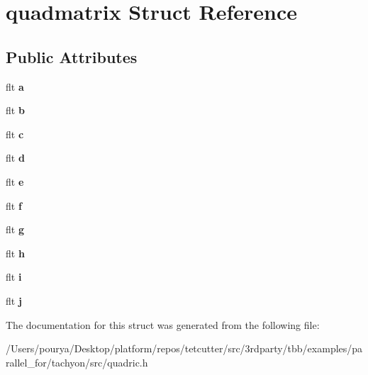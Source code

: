 \hypertarget{structquadmatrix}{}\section{quadmatrix Struct Reference}
\label{structquadmatrix}
\subsection*{Public Attributes}
\begin{DoxyCompactItemize}
\item 
\hypertarget{structquadmatrix_a3070ed936e562a8a2ebaf85258751c04}{}flt {\bfseries a}\label{structquadmatrix_a3070ed936e562a8a2ebaf85258751c04}

\item 
\hypertarget{structquadmatrix_ab70d6e0b85bae9407ec1fa6d733c500a}{}flt {\bfseries b}\label{structquadmatrix_ab70d6e0b85bae9407ec1fa6d733c500a}

\item 
\hypertarget{structquadmatrix_aa38ada8c0a5c1ef797bea1f8b524768f}{}flt {\bfseries c}\label{structquadmatrix_aa38ada8c0a5c1ef797bea1f8b524768f}

\item 
\hypertarget{structquadmatrix_ac3404ac1be96d5d5991fa146acfbe098}{}flt {\bfseries d}\label{structquadmatrix_ac3404ac1be96d5d5991fa146acfbe098}

\item 
\hypertarget{structquadmatrix_ab4513d40ae09bfacf51588614681dafc}{}flt {\bfseries e}\label{structquadmatrix_ab4513d40ae09bfacf51588614681dafc}

\item 
\hypertarget{structquadmatrix_a46f8d76c7ad5d4bc58edf72b8e210763}{}flt {\bfseries f}\label{structquadmatrix_a46f8d76c7ad5d4bc58edf72b8e210763}

\item 
\hypertarget{structquadmatrix_a13149d6521c37c01735c775e2129541e}{}flt {\bfseries g}\label{structquadmatrix_a13149d6521c37c01735c775e2129541e}

\item 
\hypertarget{structquadmatrix_aa781b47213b173a9cd9fa5e69bcd98da}{}flt {\bfseries h}\label{structquadmatrix_aa781b47213b173a9cd9fa5e69bcd98da}

\item 
\hypertarget{structquadmatrix_a82ba541667c2545b2af5a82d9f7643e9}{}flt {\bfseries i}\label{structquadmatrix_a82ba541667c2545b2af5a82d9f7643e9}

\item 
\hypertarget{structquadmatrix_ac171e4df63bc0ce6047554a18567083e}{}flt {\bfseries j}\label{structquadmatrix_ac171e4df63bc0ce6047554a18567083e}

\end{DoxyCompactItemize}


The documentation for this struct was generated from the following file\+:\begin{DoxyCompactItemize}
\item 
/\+Users/pourya/\+Desktop/platform/repos/tetcutter/src/3rdparty/tbb/examples/parallel\+\_\+for/tachyon/src/quadric.\+h\end{DoxyCompactItemize}
